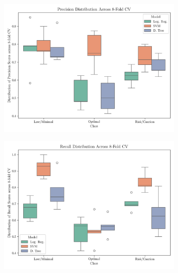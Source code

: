 \documentclass[conference]{IEEEtran}
\begin{document}
\begin{figure}[H]
    \centering
    \begin{subfigure}[1]{\linewidth}
        \centering
        \includegraphics[width=0.91\linewidth]{assets/box_precision.png}
        \caption{ }
        \label{box_precision}
    \end{subfigure}
    
    \vspace{0.05cm}

    \begin{subfigure}[1]{\linewidth}
        \centering
        \includegraphics[width=0.91\linewidth]{assets/box_recall.png}
        \caption{ }
        \label{box_recall}
    \end{subfigure}

    \vspace{0.05cm}


\end{figure}
\end{document}
